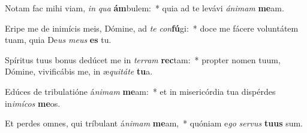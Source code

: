 \item Notam fac mihi viam, \textit{in} \textit{qua} \textbf{ám}bulem:~* quia ad te levávi \textit{á}\textit{ni}\textit{mam} \textbf{me}am.
\item Eripe me de inimícis meis, Dómine, ad \textit{te} \textit{con}\textbf{fú}gi:~* doce me fácere voluntátem tuam, quia De\textit{us} \textit{me}\textit{us} \textbf{es} tu.
\item Spíritus tuus bonus dedúcet me in \textit{ter}\textit{ram} \textbf{rec}tam:~* propter nomen tuum, Dómine, vivificábis me, in æ\textit{qui}\textit{tá}\textit{te} \textbf{tu}a.
\item Edúces de tribulatióne á\textit{ni}\textit{mam} \textbf{me}am:~* et in misericórdia tua dispérdes in\textit{i}\textit{mí}\textit{cos} \textbf{me}os.
\item Et perdes omnes, qui tríbulant á\textit{ni}\textit{mam} \textbf{me}am,~* quóniam e\textit{go} \textit{ser}\textit{vus} \textbf{tu}\textbf{us} sum.
